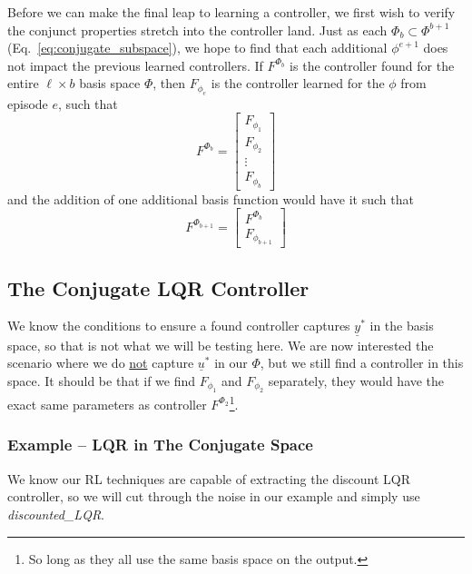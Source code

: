 Before we can make the final leap to learning a controller, we first wish to verify the conjunct properties stretch into the controller land. Just as each $\Phi_b \subset \Phi^{b+1}$ (Eq.~\ref{eq:conjugate_subspace}), we hope to find that each additional $\phi^{e+1}$ does not impact the previous learned controllers. If $F^{\Phi_b}$ is the controller found for the entire $\ell \times b$ basis space $\Phi$, then $F_{\phi_e}$ is the controller learned for the $\phi$ from episode $e$, such that
\begin{equation}
    F^{\Phi_b} = \begin{bmatrix}
        F_{\phi_1} \\ F_{\phi_2} \\ \vdots \\ F_{\phi_b}
    \end{bmatrix}
\end{equation}
and the addition of one additional basis function would have it such that
\begin{equation}
    F^{\Phi_{b+1}} = \begin{bmatrix}
        F^{\Phi_b} \\ F_{\phi_{b+1}}
    \end{bmatrix}
\end{equation}

\FloatBarrier\subsection{The Conjugate LQR Controller}
We know the conditions to ensure a found controller captures $\underline{y}^\ast$ in the basis space, so that is not what we will be testing here. We are now interested the scenario where we do \underline{not} capture $\underline{u}^\ast$ in our $\Phi$, but we still find a controller in this space. It should be that if we find $F_{\phi_1}$ and $F_{\phi_2}$ separately, they would have the exact same parameters as controller $F^{\Phi_2}$\footnote{So long as they all use the same basis space on the output.}.

\FloatBarrier\subsubsection{Example -- LQR in The Conjugate Space}
We know our RL techniques are capable of extracting the discount LQR controller, so we will cut through the noise in our example and simply use \textit{discounted\_LQR}.

